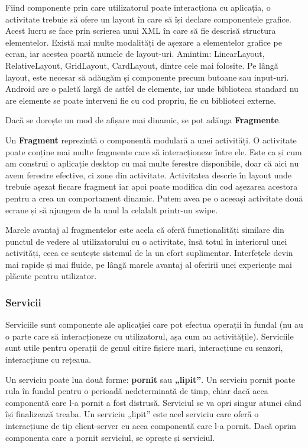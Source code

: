 \documentclass[12pt,a4paper]{article}
\begin{document}
Fiind componente prin care utilizatorul poate interacționa cu aplicația, o activitate trebuie să ofere un layout în care să își declare componentele grafice. Acest lucru se face prin scrierea unui XML în care să fie descrisă structura elementelor. Există mai multe modalități de așezare a elementelor grafice pe ecran, iar acestea poartă numele de layout-uri. Amintim: LinearLayout, RelativeLayout, GridLayout, CardLayout, dintre cele mai folosite. Pe lângă layout, este necesar să adăugăm și componente precum butoane sau input-uri. Android are o paletă largă de astfel de elemente, iar unde biblioteca standard nu are elemente se poate interveni fie cu cod propriu, fie cu biblioteci externe.

Dacă se dorește un mod de afișare mai dinamic, se pot adăuga \textbf{Fragmente}.

Un \textbf{Fragment} reprezintă o componentă modulară a unei activități. O activitate poate conține mai multe fragmente care să interacționeze între ele. Este ca și cum am construi o aplicație desktop cu mai multe ferestre disponibile, doar că aici nu avem ferestre efective, ci zone din activitate. Activitatea descrie în layout unde trebuie așezat fiecare fragment iar apoi poate modifica din cod așezarea acestora pentru a crea un comportament dinamic. Putem avea pe o aceeași activitate două ecrane și să ajungem de la unul la celalalt printr-un swipe.

Marele avantaj al fragmentelor este acela că oferă funcționalități similare din punctul de vedere al utilizatorului cu o activitate, însă totul în interiorul unei activități, ceea ce scutește sistemul de la un efort suplimentar. Interfețele devin mai rapide și mai fluide, pe lângă marele avantaj al oferirii unei experiențe mai plăcute pentru utilizator.

\subsubsection{Servicii}
Serviciile sunt componente ale aplicației care pot efectua operații în fundal (nu au o parte care să interacționeze cu utilizatorul, așa cum au activitățile). Serviciile sunt utile pentru operații de genul citire fișiere mari, interacțiune cu senzori, interacțiune cu rețeaua.

Un serviciu poate lua două forme: \textbf{pornit} sau \textbf{„lipit”}. Un serviciu pornit poate rula în fundal pentru o perioadă nedeterminată de timp, chiar dacă acea componentă care l-a pornit a fost distrusă. Serviciul se va opri singur atunci când își finalizează treaba. Un serviciu „lipit” este acel serviciu care oferă o interacțiune de tip client-server cu acea componentă care l-a pornit. Dacă oprim componenta care a pornit serviciul, se oprește și serviciul.
\end{document}
